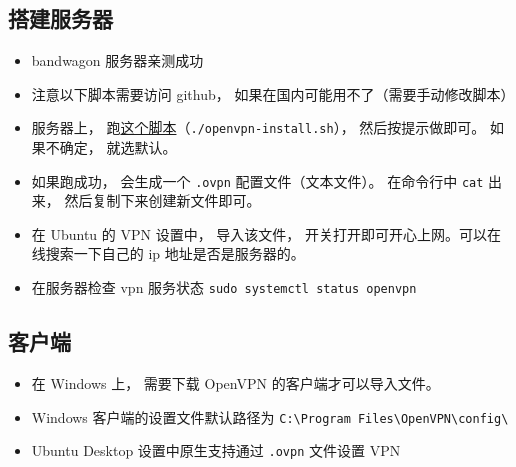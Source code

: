 
\begin{issues}
\issueDraft
\end{issues}

\subsection{搭建服务器}
\begin{itemize}
\item bandwagon 服务器亲测成功
\item 注意以下脚本需要访问 github， 如果在国内可能用不了（需要手动修改脚本）
\item 服务器上， 跑\href{https://github.com/MacroUniverse/openvpn-install/blob/master/openvpn-install.sh}{这个脚本}（\verb`./openvpn-install.sh`）， 然后按提示做即可。 如果不确定， 就选默认。
\item 如果跑成功， 会生成一个 \verb`.ovpn` 配置文件（文本文件）。 在命令行中 \verb`cat` 出来， 然后复制下来创建新文件即可。
\item 在 Ubuntu 的 VPN 设置中， 导入该文件， 开关打开即可开心上网。可以在线搜索一下自己的 ip 地址是否是服务器的。
\item 在服务器检查 vpn 服务状态 \verb`sudo systemctl status openvpn`
\end{itemize}

\subsection{客户端}
\begin{itemize}
\item 在 Windows 上， 需要下载 OpenVPN 的客户端才可以导入文件。
\item Windows 客户端的设置文件默认路径为 \verb`C:\Program Files\OpenVPN\config\`
\item Ubuntu Desktop 设置中原生支持通过 \verb`.ovpn` 文件设置 VPN
\end{itemize}
